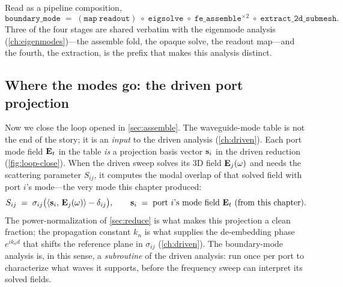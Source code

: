 Read as a pipeline composition,
\[
  \texttt{boundary\_mode}
    \;=\;
  (\texttt{map}\ \texttt{readout})
    \;\circ\;
  \texttt{eigsolve}
    \;\circ\;
  \texttt{fe\_assemble}^{\times 2}
    \;\circ\;
  \texttt{extract\_2d\_submesh}.
\]
Three of the four stages are shared verbatim with the eigenmode analysis
(\cref{ch:eigenmodes})---the assemble fold, the opaque solve, the readout
map---and the fourth, the extraction, is the prefix that makes this analysis
distinct.

\subsection{Where the modes go: the driven port projection}

Now we close the loop opened in \cref{sec:assemble}. The waveguide-mode table is
not the end of the story; it is an \emph{input} to the driven analysis
(\cref{ch:driven}). Each port mode field $\mathbf{E}_t$ in the table \emph{is} a
projection basis vector $\mathbf{s}_i$ in the driven reduction
(\cref{fig:loop-close}). When the driven sweep solves its 3D field $\mathbf{E}_j(\omega)$
and needs the scattering parameter $S_{ij}$, it computes the modal overlap of that
solved field with port $i$'s mode---the very mode this chapter produced:
\[
  S_{ij}
    \;=\;
  \sigma_{ij}\bigl(\left\langle \mathbf{s}_i,\, \mathbf{E}_j(\omega)\right\rangle - \delta_{ij}\bigr),
  \qquad
  \mathbf{s}_i \;=\; \text{port $i$'s mode field } \mathbf{E}_t \text{ (from this chapter)}.
\]
The power-normalization of \cref{sec:reduce} is what makes this projection a clean
fraction; the propagation constant $k_n$ is what supplies the de-embedding phase
$e^{ik_n d}$ that shifts the reference plane in $\sigma_{ij}$ (\cref{ch:driven}).
The boundary-mode analysis is, in this sense, a \emph{subroutine} of the driven
analysis: run once per port to characterize what waves it supports, before the
frequency sweep can interpret its solved fields.

